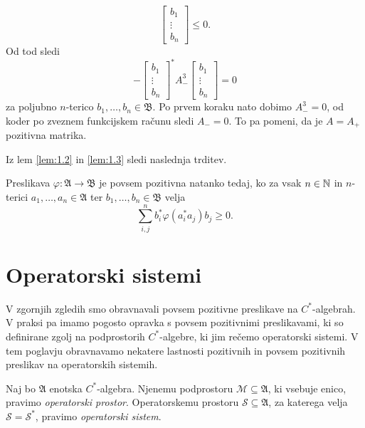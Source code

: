 \begin{dokaz}
\begin{enumerate}
$$\begin{bmatrix}
            b_1 \\ \vdots \\ b_n
        \end{bmatrix}\leq 0.$$ Od tod sledi
        $$- \begin{bmatrix}
            b_1 \\ \vdots \\ b_n
        \end{bmatrix}^* A_- ^3 \begin{bmatrix}
            b_1 \\ \vdots \\ b_n
        \end{bmatrix} = 0$$ za poljubno $n$-terico $b_1, \dots, b_n \in \mathfrak{B}$.
        Po prvem koraku nato dobimo $A_- ^3 = 0$, od koder po zveznem funkcijskem računu sledi $A_- = 0$.
        To pa pomeni, da je $A = A_+$ pozitivna matrika. \qedhere
    \end{enumerate}
\end{dokaz}

Iz lem \ref{lem:1.2} in \ref{lem:1.3} sledi naslednja trditev.

\begin{trditev}
    Preslikava $\varphi: \mathfrak{A} \to \mathfrak{B}$ je povsem pozitivna natanko tedaj,
    ko za vsak $n \in \mathbb N$ in $n$-terici $a_1, \dots, a_n \in \mathfrak{A}$ ter $b_1, \dots, b_n \in \mathfrak{B}$
    velja $$\sum_{i, j} ^n b_i ^* \varphi (a_i ^* a_j) b_j \geq 0.$$
\end{trditev}

\section{Operatorski sistemi}\label{sec:3}

V zgornjih zgledih smo obravnavali povsem pozitivne preslikave na $C^*$-algebrah.
V praksi pa imamo pogosto opravka s povsem pozitivnimi preslikavami, ki so definirane zgolj na 
podprostorih $C^*$-algebre, ki jim rečemo operatorski sistemi. V tem poglavju obravnavamo nekatere lastnosti 
pozitivnih in povsem pozitivnih preslikav na operatorskih sistemih. 

\begin{definicija}
    Naj bo $\mathfrak{A}$ enotska $C^*$-algebra. Njenemu podprostoru $\mathcal{M} \subseteq \mathfrak{A}$,
    ki vsebuje enico, pravimo \emph{operatorski prostor}. Operatorskemu prostoru $\mathcal{S} \subseteq \mathfrak{A}$,
    za katerega velja $\mathcal{S} = \mathcal{S}^*$, pravimo \emph{operatorski sistem}.
\end{definicija}

